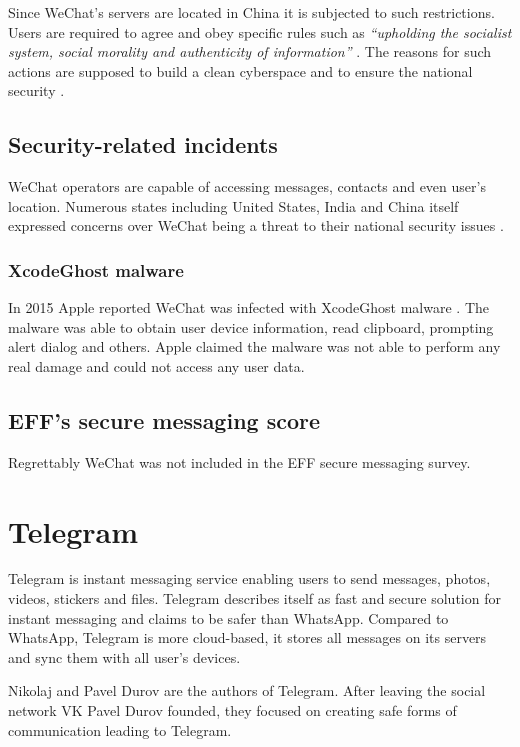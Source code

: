 \documentclass[thesis=M,english]{FITthesis}[2012/10/20]
\begin{document}
Since WeChat's servers are located in China it is subjected to such restrictions. Users are required to agree and obey specific rules such as \emph{``upholding the socialist system, social morality and authenticity of information''} \cite{china-imblocking}. The reasons for such actions are supposed to build a clean cyberspace and to ensure the national security \cite{china-blocking2}.

\subsection{Security-related incidents}

WeChat operators are capable of accessing messages, contacts and even user's location. Numerous states including United States, India and China itself expressed concerns over WeChat being a threat to their national security issues \cite{wechat-states}.

\subsubsection{XcodeGhost malware}

In 2015 Apple reported WeChat was infected with XcodeGhost malware \cite{wechat-xcodemalware}. The malware was able to obtain user device information, read clipboard, prompting alert dialog and others. Apple claimed the malware was not able to perform any real damage and could not access any user data. 

\subsection{EFF's secure messaging score}

Regrettably WeChat was not included in the EFF secure messaging survey.


\section{Telegram}

Telegram is instant messaging service enabling users to send messages, photos, videos, stickers and files. Telegram describes itself as fast and secure solution for instant messaging and claims to be safer than WhatsApp. Compared to WhatsApp, Telegram is more cloud-based, it stores all messages on its servers and sync them with all user's devices.\cite{telegramfaq}

Nikolaj and Pavel Durov are the authors of Telegram. After leaving the  social network VK Pavel Durov founded, they focused on creating safe forms of communication leading to Telegram.
\end{document}
